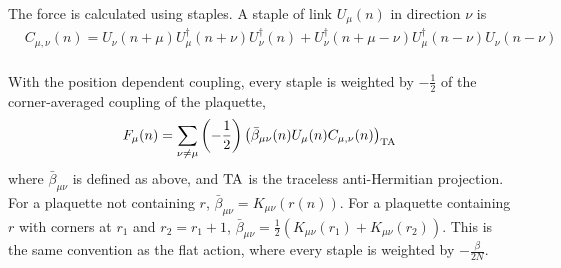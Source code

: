 The force is calculated using staples. A staple of link $U_{\mu}(n)$ in direction $\nu$ is
\begin{equation}
\begin{split}
&C_{\mu,\nu}(n)=U_{\nu}(n+\mu)U^{\dagger}_{\mu}(n+\nu)U^{\dagger}_{\nu}(n)+U^{\dagger}_{\nu}(n+\mu-\nu)U^{\dagger}_{\mu}(n-\nu)U_{\nu}(n-\nu)\\
\end{split}
\end{equation}

With the position dependent coupling, every staple is weighted by $-\frac{1}{2}$ of the corner-averaged coupling of the plaquette,
\begin{equation}
\begin{split}
&F_{\mu}(n)=\sum _{\nu\neq \mu}\left(-\frac{1}{2}\right)\left(\bar{\beta}_{\mu\nu}(n)U_{\mu}(n)C_{\mu,\nu}(n)\right)_{\rm TA}\\
\end{split}
\end{equation}
where $\bar{\beta}_{\mu\nu}$ is defined as above, and ${\rm TA}$ is the traceless anti-Hermitian projection. For a plaquette not containing $r$, $\bar{\beta}_{\mu\nu}=K_{\mu\nu}(r(n))$. For a plaquette containing $r$ with corners at $r_1$ and $r_2=r_1+1$, $\bar{\beta}_{\mu\nu}=\frac{1}{2}\left(K_{\mu\nu}(r_1)+K_{\mu\nu}(r_2)\right)$. This is the same convention as the flat action, where every staple is weighted by $-\frac{\beta}{2N}$.

\clearpage

